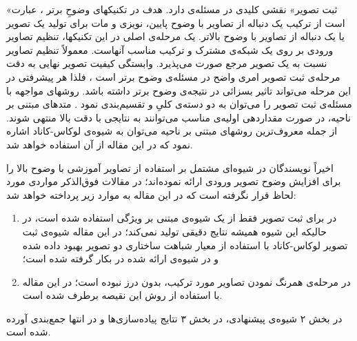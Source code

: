 \documentclass[11pt,a4paper,twocolumn]{article}
\newcommand{\SR}{وضوحِ برتر }%
\begin{document}
«ثبت تصویر» نقشی کلیدی در مسئله‌ی  دارد. هدف در  تکنیکهای \SR، عبارت است از ترکیب یک دنباله از تصاویر با وضوح پایین، نویزی و مات برای تولید یک تصویر یا یک دنباله از تصاویر با وضوح بالاتر. یک مرحله‌ی اصلی در این تکنیکها، تنظیم تصاویر ورودی بر روی یک شبکه‌ی مشترک و ترکیب مناسب آنهاست. معمولاً تنظیم تصاویر نسبت به یک تصویر مرجع صورت می‌پذیرد. وابستگی کیفیت تصویر نهایی به دقت مرحله‌ی ثبت تصویر امری واضح در مسئله‌ی وضوح برتر است \cite{Schultz96extraction}، فلذا هر پیشرفتی در این مرحله می‌تواند تاثیر بسزائی در نتیجه‌ی وضوح برتر داشته باشد. 
روشهای مواجهه با مسئله‌ی ثبت تصویر را می‌توان به دو دسته‌ی کلیِ 
 و 
 تقسیم‌بندی نمود \cite{Zitova03image}. متدهای مبتنی بر ناحیه، در صورت مقداردهی اولیه‌ی مناسب می‌توانند به نتایجی با دقت بالا منتهی شوند. از جمله معروف‌ترین روشهای مبتنی بر ناحیه می‌توان به شیوه‌ی لوکاس-کاناد\cite{Lucas81iterative} اشاره نمود که در این مقاله از آن استفاده خواهد شد.

 اخیراً نویسندگان در \cite{Amintoosi08reconstruction,Amintoosi09regional} شیوه‌ای مشتمل بر استفاده از تصاویر آموزشی با وضوح بالا را برای افزایش وضوح تصویر ورودی ارائه نموده‌اند؛ در مقالات فوق‌الذکر مواردی مورد لحاظ قرار نگرفته است که در این مقاله به موارد زیر پرداخته خواهد شد:
 \begin{enumerate}
 \item در \cite{Amintoosi08reconstruction} برای ثبت تصویر فقط از یک شیوه‌ی مبتنی بر ویژگی استفاده شده است، در حالیکه این شیوه همیشه نتایج دقیقی تولید نمی‌کند؛ در این مقاله شیوه‌ی ثبت تصویر لوکاس-کاناد با استفاده از معیار شباهت ساختاری دو تصویر \cite{Wang04image} بهبود داده شده و در شیوه‌ی ارائه شده در \cite{Amintoosi08reconstruction} بکار گرفته شده است؛
 \item در \cite{Amintoosi08reconstruction,Amintoosi09regional} مرحله‌ی همرنگ نمودن تصاویر مورد ترکیب، بدون درز نبوده است؛ در این مقاله با استفاده از روش 
\cite{Burt83multiresolution} این نقیصه برطرف شده است.
  \end{enumerate}

 در بخش ۲ شیوه‌ی پیشنهادی، در بخش ۳ نتایج پیاده‌سازی‌ها و در انتها جمع‌بندی آورده شده است.
\end{document}
